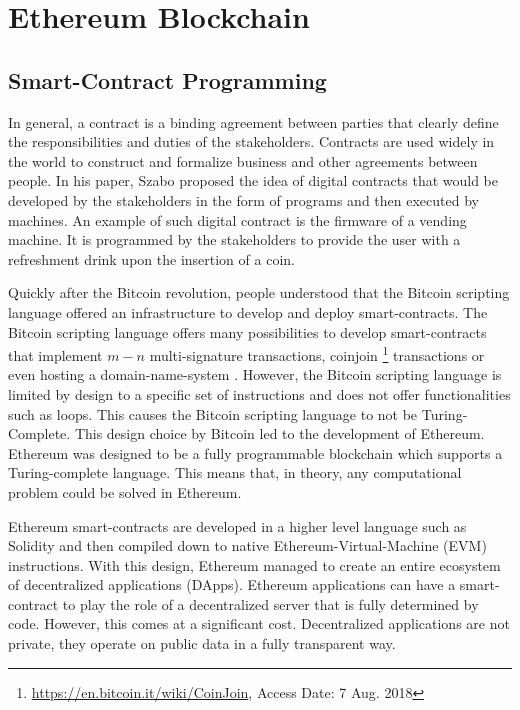 {\section{Ethereum Blockchain}{

\subsection{Smart-Contract Programming}{

In general, a contract is a binding agreement between parties that clearly define the responsibilities and duties of the stakeholders. Contracts are used widely in the world to construct and formalize business and other agreements between people. In his paper, Szabo \cite{szabo1997formalizing} proposed the idea of digital contracts that would be developed by the stakeholders in the form of programs and then executed by machines. An example of such digital contract is the firmware of a vending machine. It is programmed by the stakeholders to provide the user with a refreshment drink upon the insertion of a coin.

Quickly after the Bitcoin revolution, people understood that the Bitcoin scripting language offered an infrastructure to develop and deploy smart-contracts. The Bitcoin scripting language offers many possibilities to develop smart-contracts that implement $m-n$ multi-signature transactions, coinjoin \footnote{\url{https://en.bitcoin.it/wiki/CoinJoin}, Access Date: 7 Aug. 2018} transactions or even hosting a domain-name-system \cite{kalodner2015empirical}. However, the Bitcoin scripting language is limited by design to a specific set of instructions and does not offer functionalities such as loops. This causes the Bitcoin scripting language to not be Turing-Complete. This design choice by Bitcoin led to the development of Ethereum. Ethereum was designed to be a fully programmable blockchain which supports a Turing-complete language. This means that, in theory, any computational problem could be solved in Ethereum. 

Ethereum smart-contracts are developed in a higher level language such as Solidity and then compiled down to native Ethereum-Virtual-Machine (EVM) instructions. With this design, Ethereum managed to create an entire ecosystem of decentralized applications (DApps). Ethereum applications can have a smart-contract to play the role of a decentralized server that is fully determined by code. However, this comes at a significant cost. Decentralized applications are not private, they operate on public data in a fully transparent way.
}
}}

